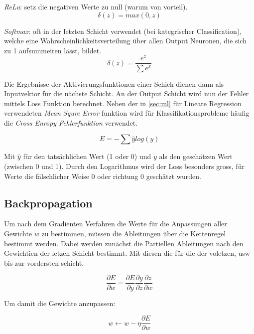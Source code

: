 \textit{ReLu}: setz die negativen Werte zu null (warum von vorteil).
\begin{equation}
    \label{eq:relu}
    \delta(z) = max(0,z)
\end{equation}


\textit{Softmax}: oft in der letzten Schicht verwendet (bei kategrischer Classification), welche eine 
Wahrscheinlichkeitsverteilung über allen Output Neuronen, die sich zu 1 aufsummeiren lässt, bildet.
\begin{equation}
    \label{eq:softmax}
    \delta(z) = \frac{e^{z}}{\sum e^{x}}
\end{equation}

Die Ergebnisse der Aktivierungsfunktionen einer Schich dienen dann als Inputvektor für die nächste Schicht.
An der Output Schicht wird nun der Fehler mittels Loss Funktion berechnet. Neben der in \ref{sec:ml} für 
Lineare Regression verwendeten \textit{Mean Squre Error} funktion wird für Klassifikationsprobleme häufig 
die \textit{Cross Enropy Fehlerfunktion} verwendet.

\begin{equation}
    \label{eq:crossentropy}
    E = -\sum\hat{y}log(y)
\end{equation}

Mit $\hat{y}$ für den tatsächlichen Wert (1 oder 0) und $y$ als den geschätzen Wert (zwischen 0 und 1).
Durch den Logarithmus wird der Loss besonders gross, für Werte die fälschlicher Weise 0 oder 
richtung 0 geschätzt wurden.


\subsection{Backpropagation}
Um nach dem Gradienten Verfahren die Werte für die Anpassungen aller Gewichte $w$ zu bestimmen, müssen die Ableitungen
über die Kettenregel bestimmt werden. Dabei werden zunächst die Partiellen Ableitungen nach den Gewichtien der
letzen Schicht bestimmt. Mit diesen die für die der voletzen, usw bis zur vordersten schicht.

\begin{equation}
    \frac{\partial E}{\partial w} = \frac{\partial E}{\partial y}\frac{\partial y}{\partial z}\frac{\partial z}{\partial w}
\end{equation}

Um damit die Gewichte anzupassen:

\begin{equation}
    w  \leftarrow w - \eta \frac{\partial E}{\partial w}
    \label{eq:gradient}
\end{equation}

